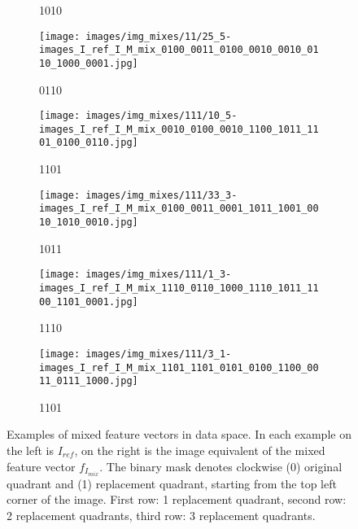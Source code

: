 \begin{figure}[h!]
\begin{subfigure}[b]{0.23\textwidth}
         \caption{1010}
         \label{fig:quad_repl_ex_2_3}
     \end{subfigure}
     \hfill
     \begin{subfigure}[b]{0.23\textwidth}
         \centering
         \texttt{[image: images/img\_mixes/11/25\_5-images\_I\_ref\_I\_M\_mix\_0100\_0011\_0100\_0010\_0010\_0110\_1000\_0001.jpg]}
         \caption{0110}
         \label{fig:quad_repl_ex_2_4}
     \end{subfigure}
     \begin{subfigure}[b]{0.23\textwidth}
         \centering
         \texttt{[image: images/img\_mixes/111/10\_5-images\_I\_ref\_I\_M\_mix\_0010\_0100\_0010\_1100\_1011\_1101\_0100\_0110.jpg]}
         \caption{1101}
         \label{fig:quad_repl_ex_3_1}
     \end{subfigure}
     \hfill     
     \begin{subfigure}[b]{0.23\textwidth}
         \centering
         \texttt{[image: images/img\_mixes/111/33\_3-images\_I\_ref\_I\_M\_mix\_0100\_0011\_0001\_1011\_1001\_0010\_1010\_0010.jpg]}
         \caption{1011}
         \label{fig:quad_repl_ex_3_2}
     \end{subfigure}
     \hfill
     \begin{subfigure}[b]{0.23\textwidth}
         \centering
         \texttt{[image: images/img\_mixes/111/1\_3-images\_I\_ref\_I\_M\_mix\_1110\_0110\_1000\_1110\_1011\_1100\_1101\_0001.jpg]}
         \caption{1110}
         \label{fig:quad_repl_ex_3_3}
     \end{subfigure}
     \hfill
     \begin{subfigure}[b]{0.23\textwidth}
         \centering
         \texttt{[image: images/img\_mixes/111/3\_1-images\_I\_ref\_I\_M\_mix\_1101\_1101\_0101\_0100\_1100\_0011\_0111\_1000.jpg]}
         \caption{1101}
         \label{fig:quad_repl_ex_3_4}
     \end{subfigure}     
    \caption{Examples of mixed feature vectors in data space. In each example on the left is $I_{ref}$, on the right is the image equivalent of the mixed feature vector $f_{I_{mix}}$. The binary mask denotes clockwise (0) original quadrant and (1) replacement quadrant, starting from the top left corner of the image. First row: 1 replacement quadrant, second row: 2 replacement quadrants, third row: 3 replacement quadrants.}
    \label{fig:quad_repl_ex}
\end{figure}